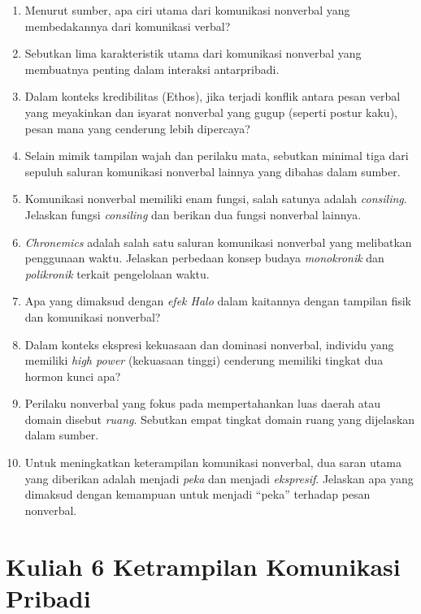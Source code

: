 \documentclass[
  letterpaper,
  DIV=11,
  numbers=noendperiod]{scrreprt}
\providecommand{\tightlist}{%
  \setlength{\itemsep}{0pt}\setlength{\parskip}{0pt}}
\begin{document}
\begin{enumerate}
\def\labelenumi{\arabic{enumi}.}
\tightlist
\item
  Menurut sumber, apa ciri utama dari komunikasi nonverbal yang
  membedakannya dari komunikasi verbal?
\item
  Sebutkan lima karakteristik utama dari komunikasi nonverbal yang
  membuatnya penting dalam interaksi antarpribadi.
\item
  Dalam konteks kredibilitas (Ethos), jika terjadi konflik antara pesan
  verbal yang meyakinkan dan isyarat nonverbal yang gugup (seperti
  postur kaku), pesan mana yang cenderung lebih dipercaya?
\item
  Selain mimik tampilan wajah dan perilaku mata, sebutkan minimal tiga
  dari sepuluh saluran komunikasi nonverbal lainnya yang dibahas dalam
  sumber.
\item
  Komunikasi nonverbal memiliki enam fungsi, salah satunya adalah
  \emph{consiling}. Jelaskan fungsi \emph{consiling} dan berikan dua
  fungsi nonverbal lainnya.
\item
  \emph{Chronemics} adalah salah satu saluran komunikasi nonverbal yang
  melibatkan penggunaan waktu. Jelaskan perbedaan konsep budaya
  \emph{monokronik} dan \emph{polikronik} terkait pengelolaan waktu.
\item
  Apa yang dimaksud dengan \emph{efek Halo} dalam kaitannya dengan
  tampilan fisik dan komunikasi nonverbal?
\item
  Dalam konteks ekspresi kekuasaan dan dominasi nonverbal, individu yang
  memiliki \emph{high power} (kekuasaan tinggi) cenderung memiliki
  tingkat dua hormon kunci apa?
\item
  Perilaku nonverbal yang fokus pada mempertahankan luas daerah atau
  domain disebut \emph{ruang}. Sebutkan empat tingkat domain ruang yang
  dijelaskan dalam sumber.
\item
  Untuk meningkatkan keterampilan komunikasi nonverbal, dua saran utama
  yang diberikan adalah menjadi \emph{peka} dan menjadi
  \emph{ekspresif}. Jelaskan apa yang dimaksud dengan kemampuan untuk
  menjadi ``peka'' terhadap pesan nonverbal.
\end{enumerate}


\chapter{Kuliah 6 Ketrampilan Komunikasi
Pribadi}\label{kuliah-6-ketrampilan-komunikasi-pribadi}
\end{document}
